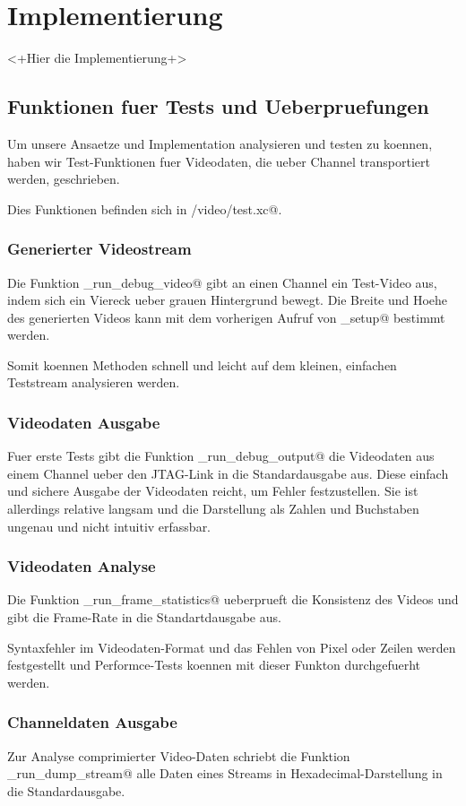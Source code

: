 
\chapter{Implementierung}
<+Hier die Implementierung+>

\section{Funktionen fuer Tests und Ueberpruefungen}
Um unsere Ansaetze und Implementation analysieren und testen zu koennen,
haben wir Test-Funktionen fuer Videodaten, die ueber Channel transportiert
werden, geschrieben.

Dies Funktionen befinden sich in \verb@board/video/test.xc@.

\subsection{Generierter Videostream}
Die Funktion \lstinline@tst_run_debug_video@ gibt an einen Channel ein Test-Video aus,
indem sich ein Viereck ueber grauen Hintergrund bewegt.
Die Breite und Hoehe des generierten Videos kann mit dem vorherigen Aufruf von
\lstinline@tst_setup@ bestimmt werden. 

Somit koennen Methoden schnell und leicht auf dem kleinen, einfachen
Teststream analysieren werden.

\subsection{Videodaten Ausgabe}
Fuer erste Tests gibt die Funktion \lstinline@tst_run_debug_output@ die
Videodaten aus einem Channel ueber den JTAG-Link in die Standardausgabe aus.
Diese einfach und sichere Ausgabe der Videodaten reicht, um Fehler
festzustellen. 
Sie ist allerdings relative langsam und die Darstellung als Zahlen und Buchstaben
ungenau und nicht intuitiv erfassbar.

\subsection{Videodaten Analyse}
Die Funktion \lstinline@tst_run_frame_statistics@ ueberprueft die Konsistenz des
Videos und gibt die Frame-Rate in die Standartdausgabe aus.

Syntaxfehler im Videodaten-Format und das Fehlen von Pixel oder Zeilen 
werden festgestellt und Performce-Tests koennen mit dieser Funkton durchgefuerht
werden.

\subsection{Channeldaten Ausgabe}
Zur Analyse comprimierter Video-Daten schriebt die Funktion 
\lstinline@tst_run_dump_stream@ alle Daten eines Streams in
Hexadecimal-Darstellung in die Standardausgabe.



